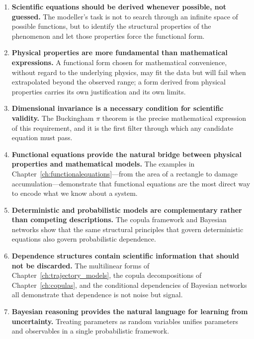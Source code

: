 \begin{enumerate}

\item \textbf{Scientific equations should be derived whenever possible, not guessed.} The modeller's task is not to search through an infinite space of possible functions, but to identify the structural properties of the phenomenon and let those properties force the functional form.

\item \textbf{Physical properties are more fundamental than mathematical expressions.} A functional form chosen for mathematical convenience, without regard to the underlying physics, may fit the data but will fail when extrapolated beyond the observed range; a form derived from physical properties carries its own justification and its own limits.

\item \textbf{Dimensional invariance is a necessary condition for scientific validity.} The Buckingham \(\pi\) theorem is the precise mathematical expression of this requirement, and it is the first filter through which any candidate equation must pass.

\item \textbf{Functional equations provide the natural bridge between physical properties and mathematical models.} The examples in Chapter~\ref{ch:functionalequations}—from the area of a rectangle to damage accumulation—demonstrate that functional equations are the most direct way to encode what we know about a system.

\item \textbf{Deterministic and probabilistic models are complementary rather than competing descriptions.} The copula framework and Bayesian networks show that the same structural principles that govern deterministic equations also govern probabilistic dependence.

\item \textbf{Dependence structures contain scientific information that should not be discarded.} The multilinear forms of Chapter~\ref{ch:trajectory_models}, the copula decompositions of Chapter~\ref{ch:copulas}, and the conditional dependencies of Bayesian networks all demonstrate that dependence is not noise but signal.

\item \textbf{Bayesian reasoning provides the natural language for learning from uncertainty.} Treating parameters as random variables unifies parameters and observables in a single probabilistic framework.


\end{enumerate}
